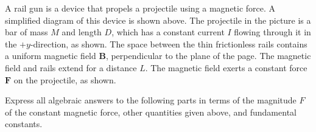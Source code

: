 \documentclass{../../../oss-ap12ibhl}
\begin{document}
\begin{questions}
  \newpage

  \question A rail gun is a device that propels a projectile using a magnetic
  force. A simplified diagram of this device is shown above. The projectile in
  the picture is a bar of mass $M$ and length $D$, which has a constant current
  $I$ flowing through it in the $+y$-direction, as shown. The space between the
  thin frictionless rails contains a uniform magnetic field $\bm{B}$,
  perpendicular to the plane of the page. The magnetic field and rails extend
  for a distance $L$. The magnetic field exerts a constant force $\bm{F}$ on
  the projectile, as shown.

  Express all algebraic answers to the following parts in terms of the
  magnitude $F$ of the constant magnetic force, other quantities given above,
  and fundamental constants.
\end{questions}
\end{document}
